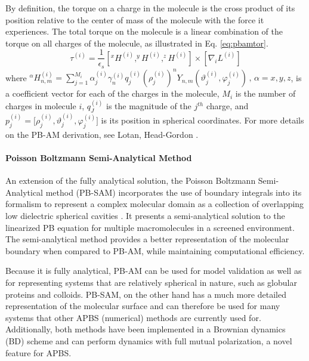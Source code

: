 \documentclass[11pt,titlepage]{article}
\begin{document}
%
By definition, the torque on a charge in the molecule is the cross product of its position relative to the center of mass of the molecule with the force it experiences. The total torque on the molecule is a linear combination of the torque on all charges of the molecule, as illustrated in Eq. \ref{eq:pbamtor}.
%
\begin{equation}\label{eq:pbamtor}
\tau^{(i)} =  \frac{1}{\epsilon_s}\left [  ^xH^{(i)}, ^yH^{(i)}, ^zH^{(i)} \right] \times   \left [  \nabla_i L^{(i)} \right ]
\end{equation} 
%
where $^\alpha H_{n,m}^{(i)}  = \sum_{j=1}^{M_i} \alpha_{j}^{(i)} \gamma_n^{(i)} q_j^{(i)} (\rho_j^{(i)})^n Y_{n,m} (\vartheta_j^{(i)}, \varphi_j^{(i)}) \, , \, \alpha = x , y, z$, is a coefficient vector for each of the charges in the molecule, $M_i$ is the number of charges in molecule $i$, $q_J^{(i)}$ is the magnitude of the $j^{th}$ charge, and $p_j^{(i)}=\Big[\rho_j^{(i)},\vartheta_j^{(i)},\varphi_j^{(i)}\Big]$ is its position in spherical coordinates. For more details on the PB-AM derivation, see Lotan, Head-Gordon \cite{lotan2006}.

\paragraph{Poisson Boltzmann Semi-Analytical Method}

An extension of the fully analytical solution, the Poisson Boltzmann Semi-Analytical method (PB-SAM) incorporates the use of boundary integrals into its formalism to represent a complex molecular domain as a collection of overlapping low dielectric spherical cavities \cite{yap2010}.  It presents a semi-analytical solution to the linearized PB equation for multiple macromolecules in a screened environment. The semi-analytical method provides a better representation of the molecular boundary when compared to PB-AM, while maintaining computational efficiency.

Because it is fully analytical, PB-AM can be used for model validation as well as for representing systems that are relatively spherical in nature, such as globular proteins and colloids. PB-SAM, on the other hand has a much more detailed representation of the molecular surface and can therefore be used for many systems that other APBS (numerical) methods are currently used for. Additionally, both methods have been implemented in a Brownian dynamics (BD) scheme \cite{ermak1978} and can perform dynamics with full mutual polarization, a novel feature for APBS.
\end{document}
